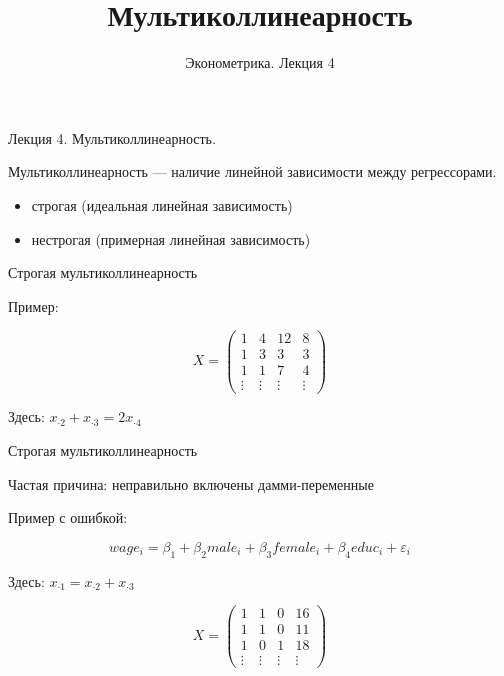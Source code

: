 \documentclass[ignorenonframetext,]{beamer}
\author[Эконометрика. Лекция 4]{Эконометрика. Лекция 4}
\title{Мультиколлинеарность}
\date{}
\begin{document}
\frame{\titlepage}

\begin{frame}

Лекция 4. Мультиколлинеарность.

\end{frame}

\begin{frame}{Мультиколлинеарность --- наличие линейной зависимости
между регрессорами.}

\begin{itemize}
\itemsep1pt\parskip0pt
\item
  строгая (идеальная линейная зависимость)
\item
  нестрогая (примерная линейная зависимость)
\end{itemize}

\end{frame}

\begin{frame}{Строгая мультиколлинеарность}

Пример:

\[
X=\begin{pmatrix}
1 & 4 & 12 & 8 \\ 
1 & 3 & 3 & 3 \\ 
1 & 1 & 7 & 4 \\ 
\vdots & \vdots & \vdots & \vdots
\end{pmatrix} 
\]

Здесь: \(x_{\cdot 2}+x_{\cdot 3}=2x_{\cdot 4}\)

\end{frame}

\begin{frame}{Строгая мультиколлинеарность}

Частая причина: неправильно включены дамми-переменные

Пример с ошибкой:

\[
wage_i=\beta_1 + \beta_2 male_i + \beta_3 female_i + \beta_4 educ_i + \varepsilon_i
\]

Здесь: \(x_{\cdot 1}=x_{\cdot 2}+x_{\cdot 3}\)

\[
X=\begin{pmatrix}
1 & 1 & 0 & 16 \\ 
1 & 1 & 0 & 11 \\ 
1 & 0 & 1 & 18 \\ 
\vdots & \vdots & \vdots & \vdots
\end{pmatrix} 
\]

\end{frame}
\end{document}

